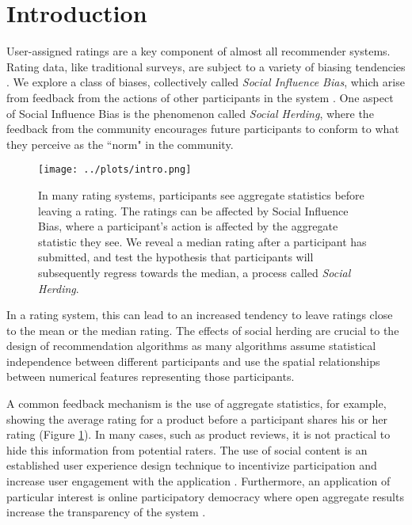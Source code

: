 \section{Introduction}
User-assigned ratings are a key component of almost all recommender systems.
Rating data, like traditional surveys, are subject to a variety of biasing tendencies \cite{groves2013survey}.
We explore a class of biases, collectively called \emph{Social Influence Bias}, which arise from feedback from the actions of other participants in the system \cite{demarzo2003persuasion, moscovici1972social, wood2000attitude}.
One aspect of Social Influence Bias is the phenomenon called \emph{Social Herding}, where the feedback from the community encourages future participants to conform to what they perceive as the ``norm" in the community. 
\begin{figure}[t]
  \centering
    \texttt{[image: ../plots/intro.png]}
      \caption{In many rating systems, participants see aggregate statistics before leaving a rating. The ratings can be affected by Social Influence Bias, where a participant's action is affected by the aggregate statistic they see. We reveal a median rating after a participant has submitted, and test the hypothesis that participants will subsequently regress towards the median, a process called \emph{Social Herding}.}
      \label{grading-0}
\end{figure}
In a rating system, this can lead to an increased tendency to leave ratings close to the mean or the median rating. 
The effects of social herding are crucial to the design of recommendation algorithms as many algorithms assume statistical independence between different participants and use the spatial relationships between numerical features representing those participants.

A common feedback mechanism is the use of aggregate statistics, for example, showing the average rating for a product before a participant shares his or her rating (Figure \ref{grading-0}).
In many cases, such as product reviews, it is not practical to hide this information from potential raters.
The use of social content is an established user experience design technique to incentivize participation and increase user engagement with the application \cite{shneiderman1992designing}.
Furthermore, an application of particular interest is online participatory democracy where open aggregate results increase the transparency of the system \cite{albors2008new,o2012transparency,noveck2008wiki}.


